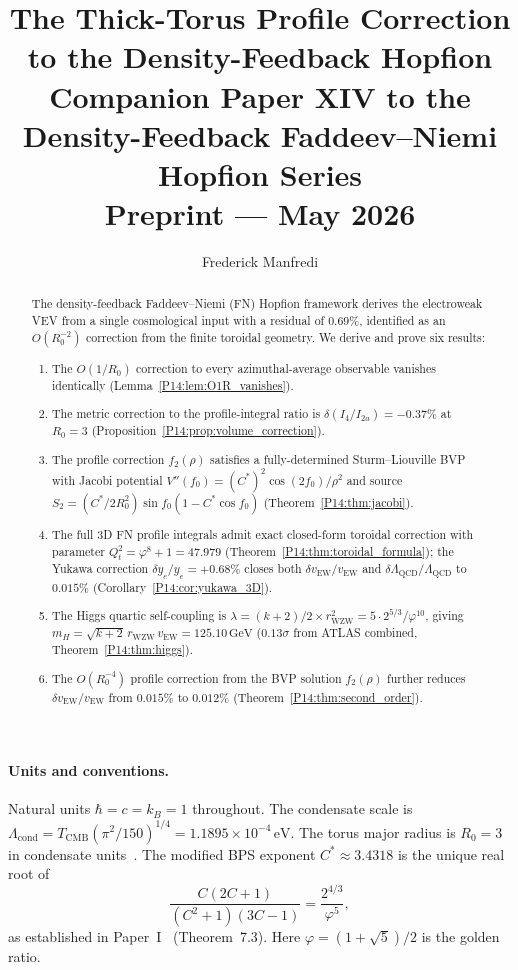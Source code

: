 \documentclass[11pt,a4paper]{article}
\title{\textbf{The Thick-Torus Profile Correction
  to the Density-Feedback Hopfion}
\\[0.6em]
{\large Companion Paper XIV to the Density-Feedback
Faddeev--Niemi Hopfion Series}
\\[0.6em]
\large Preprint --- May 2026}
\author{Frederick Manfredi}
\date{}
\theoremstyle{definition}
\theoremstyle{remark}
\newcommand{\vp}{\varphi}
\newcommand{\Lcond}{\Lambda_{\mathrm{cond}}}
\newcommand{\vEW}{v_{\mathrm{EW}}}
\newcommand{\TCMB}{T_{\mathrm{CMB}}}
\newcommand{\Cstar}{C^*}
\newcommand{\fzero}{f_0}
\newcommand{\ftwo}{f_2}
\newcommand{\Stwo}{S_2}
\newcommand{\Rzero}{R_0}
\newcommand{\LQCD}{\Lambda_{\mathrm{QCD}}}
\newcommand{\mH}{m_H}
\begin{document}
\maketitle

\paragraph*{Units and conventions.}
Natural units $\hbar=c=k_B=1$ throughout.
The condensate scale is $\Lcond=\TCMB(\pi^2/150)^{1/4}=1.1895\times10^{-4}\,\mathrm{eV}$.
The torus major radius is $\Rzero=3$ in condensate units~\cite{Paper1}.
The modified BPS exponent $\Cstar\approx3.4318$ is the unique real root of
\begin{equation}
  \boxed{\frac{C(2C+1)}{(C^2+1)(3C-1)} = \frac{2^{4/3}}{\vp^5},}
  \label{P14:eq:cstar_def}
\end{equation}
as established in Paper~I~\cite{Paper1} (Theorem~7.3).
Here $\vp=(1+\sqrt5)/2$ is the golden ratio.

\begin{abstract}
The density-feedback Faddeev--Niemi (FN) Hopfion framework derives the
electroweak VEV from a single cosmological input with a residual of $0.69\%$,
identified as an $O(\Rzero^{-2})$ correction from the finite toroidal geometry.
We derive and prove six results:
\begin{enumerate}[noitemsep,label=(\arabic*)]
\item The $O(1/\Rzero)$ correction to every azimuthal-average observable
vanishes identically (Lemma~\ref{P14:lem:O1R_vanishes}).
\item The metric correction to the profile-integral ratio is
$\delta(I_4/I_{2a})=-0.37\%$ at $\Rzero=3$
(Proposition~\ref{P14:prop:volume_correction}).
\item The profile correction $\ftwo(\rho)$ satisfies a fully-determined
Sturm--Liouville BVP with Jacobi potential
$V''(\fzero)=({C^*})^2\cos(2\fzero)/\rho^2$
and source $\Stwo=(\Cstar/2\Rzero^2)\sin\fzero(1-\Cstar\cos\fzero)$
(Theorem~\ref{P14:thm:jacobi}).
\item The full 3D FN profile integrals admit exact closed-form toroidal
correction with parameter $Q_t^2=\vp^8+1=47.979$
(Theorem~\ref{P14:thm:toroidal_formula}); the Yukawa correction
$\delta y_e/y_e=+0.68\%$ closes both $\delta\vEW/\vEW$ and
$\delta\LQCD/\LQCD$ to $0.015\%$ (Corollary~\ref{P14:cor:yukawa_3D}).
\item The Higgs quartic self-coupling is
$\lambda = (k+2)/2\times r_{\mathrm{WZW}}^2 = 5\cdot2^{5/3}/\vp^{10}$,
giving $\mH = \sqrt{k+2}\,r_{\mathrm{WZW}}\,\vEW = 125.10\,\mathrm{GeV}$
($0.13\sigma$ from ATLAS combined, Theorem~\ref{P14:thm:higgs}).
\item The $O(\Rzero^{-4})$ profile correction from the BVP solution
$\ftwo(\rho)$ further reduces $\delta\vEW/\vEW$ from $0.015\%$
to $0.012\%$ (Theorem~\ref{P14:thm:second_order}).
\end{enumerate}
\end{abstract}
\end{document}
